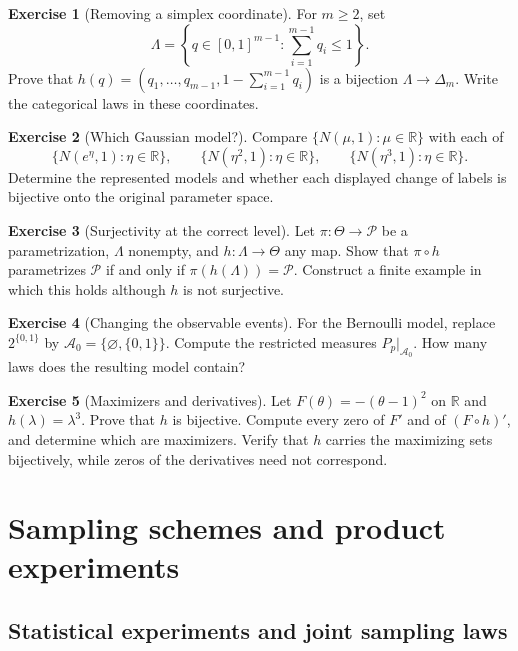 \documentclass[11pt,oneside]{book}
\theoremstyle{definition}
\newtheorem{exercise}{Exercise}[section]
\theoremstyle{remark}
\newcommand{\R}{\mathbb R}
\begin{document}
\begin{exercise}[Removing a simplex coordinate]
\label{exer:simplex-coordinates}
For $m\geq2$, set
\[
\Lambda=\left\{q\in[0,1]^{m-1}:\sum_{i=1}^{m-1}q_i\leq1\right\}.
\]
Prove that $h(q)=(q_1,\ldots,q_{m-1},1-\sum_{i=1}^{m-1}q_i)$ is a bijection
$\Lambda\to\Delta_m$. Write the categorical laws in these coordinates.
\end{exercise}

\begin{exercise}[Which Gaussian model?]
\label{exer:gaussian-labels}
Compare $\{N(\mu,1):\mu\in\R\}$ with each of
\[
\{N(e^\eta,1):\eta\in\R\},\qquad
\{N(\eta^2,1):\eta\in\R\},\qquad
\{N(\eta^3,1):\eta\in\R\}.
\]
Determine the represented models and whether each displayed change of labels
is bijective onto the original parameter space.
\end{exercise}

\begin{exercise}[Surjectivity at the correct level]
\label{exer:surjectivity}
Let $\pi:\Theta\to\mathcal P$ be a parametrization, $\Lambda$ nonempty,
and $h:\Lambda\to\Theta$ any map.
Show that $\pi\circ h$ parametrizes $\mathcal P$ if and only if
$\pi(h(\Lambda))=\mathcal P$.
Construct a finite example in which this holds although $h$ is not surjective.
\end{exercise}

\begin{exercise}[Changing the observable events]
\label{exer:coarse-sigma-algebra}
For the Bernoulli model, replace $2^{\{0,1\}}$ by
$\mathcal A_0=\{\varnothing,\{0,1\}\}$.
Compute the restricted measures $P_p|_{\mathcal A_0}$.
How many laws does the resulting model contain?
\end{exercise}

\begin{exercise}[Maximizers and derivatives]
\label{exer:derivatives}
Let $F(\theta)=-(\theta-1)^2$ on $\R$ and $h(\lambda)=\lambda^3$.
Prove that $h$ is bijective. Compute every zero of $F'$ and of $(F\circ h)'$,
and determine which are maximizers.
Verify that $h$ carries the maximizing sets bijectively, while zeros of the
derivatives need not correspond.
\end{exercise}
\clearpage
\section{Sampling schemes and product experiments}
\label{sec:sampling-schemes}

\subsection{Statistical experiments and joint sampling laws}
\label{subsec:experiments-sampling}
\end{document}
